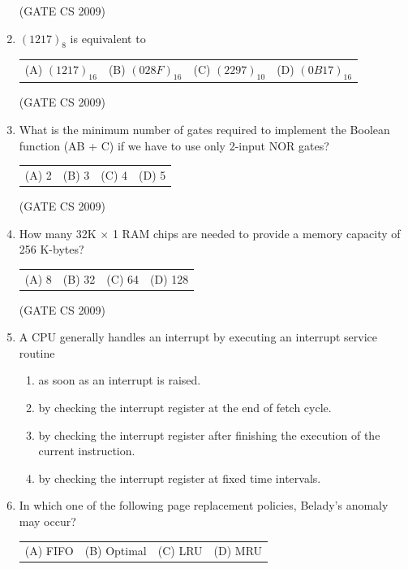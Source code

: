 \documentclass[a4paper, 11pt]{article}
\begin{document}
\begin{enumerate}
    \hfill (GATE CS 2009)

    \item $(1217)_8$ is equivalent to\\
    \begin{tabularx}{\textwidth}{@{}XXXX@{}}
    (A) $(1217)_{16}$ & (B) $(028F)_{16}$ & (C) $(2297)_{10}$ & (D) $(0B17)_{16}$
    \end{tabularx}

    \hfill (GATE CS 2009)

    \item What is the minimum number of gates required to implement the Boolean function (AB + C) if we have to use only 2-input NOR gates?\\
    \begin{tabularx}{\textwidth}{@{}XXXX@{}}
    (A) 2 & (B) 3 & (C) 4 & (D) 5
    \end{tabularx}

    \hfill (GATE CS 2009)

    \item How many 32K $\times$ 1 RAM chips are needed to provide a memory capacity of 256 K-bytes?\\
    \begin{tabularx}{\textwidth}{@{}XXXX@{}}
    (A) 8 & (B) 32 & (C) 64 & (D) 128
    \end{tabularx}

    \hfill (GATE CS 2009)

    \item A CPU generally handles an interrupt by executing an interrupt service routine
    \begin{enumerate}[label=(\Alph*)]
        \item as soon as an interrupt is raised.
        \item by checking the interrupt register at the end of fetch cycle.
        \item by checking the interrupt register after finishing the execution of the current instruction.
        \item by checking the interrupt register at fixed time intervals.
    \end{enumerate}

    \item In which one of the following page replacement policies, Belady's anomaly may occur?\\
    \begin{tabularx}{\textwidth}{@{}XXXX@{}}
    (A) FIFO & (B) Optimal & (C) LRU & (D) MRU
    \end{tabularx}


\end{enumerate}
\end{document}
